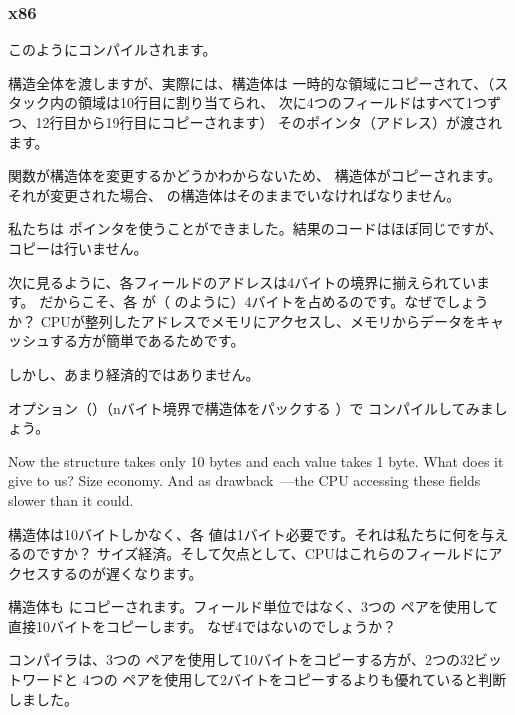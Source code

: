 ﻿\subsubsection{x86}

このようにコンパイルされます。



構造全体を渡しますが、実際には、構造体は
一時的な領域にコピーされて、（スタック内の領域は10行目に割り当てられ、
次に4つのフィールドはすべて1つずつ、12行目から19行目にコピーされます）
そのポインタ（アドレス）が渡されます。

\ttf{} 関数が構造体を変更するかどうかわからないため、
構造体がコピーされます。 
それが変更された場合、 \main の構造体はそのままでいなければなりません。

私たちは \CCpp ポインタを使うことができました。結果のコードはほぼ同じですが、
コピーは行いません。

次に見るように、各フィールドのアドレスは4バイトの境界に揃えられています。 
だからこそ、各 \Tchar が（ \Tint のように）4バイトを占めるのです。なぜでしょうか？ 
CPUが整列したアドレスでメモリにアクセスし、メモリからデータをキャッシュする方が簡単であるためです。

しかし、あまり経済的ではありません。

オプション（）（nバイト境界で構造体をパックする ）で
コンパイルしてみましょう。



Now the structure takes only 10 bytes and each \Tchar value takes 1 byte. What does it give to us?
Size economy. And as drawback~---the CPU accessing these fields slower than it could.

構造体は10バイトしかなく、各 \Tchar 値は1バイト必要です。それは私たちに何を与えるのですか？
サイズ経済。そして欠点として、CPUはこれらのフィールドにアクセスするのが遅くなります。

\label{short_struct_copying_using_MOV}

構造体も \main にコピーされます。フィールド単位ではなく、3つの \MOV ペアを使用して直接10バイトをコピーします。
なぜ4ではないのでしょうか？

コンパイラは、3つの \MOV ペアを使用して10バイトをコピーする方が、2つの32ビットワードと
4つの \MOV ペアを使用して2バイトをコピーするよりも優れていると判断しました。

